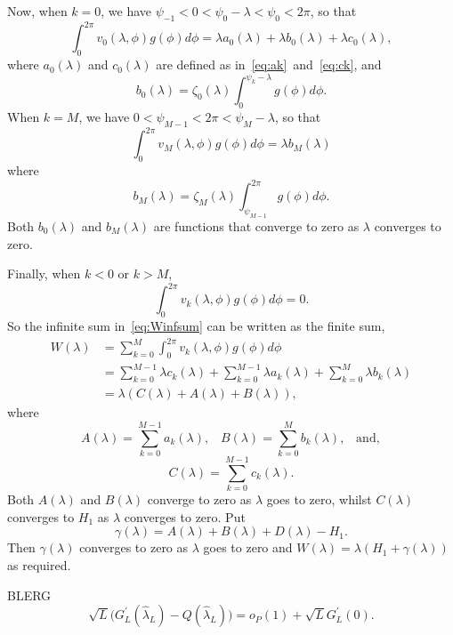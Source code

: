 \documentclass[journal]{IEEEtran}
\begin{document}
\begin{IEEEproof}
Now, when $k = 0$, we have $\psi_{-1} < 0 < \psi_0 - \lambda < \psi_0 < 2\pi$, so that
\[
\int_0^{2\pi} v_0(\lambda, \phi) g(\phi) d\phi = \lambda a_0(\lambda) + \lambda b_0(\lambda) +  \lambda c_0(\lambda),
\]
where $a_0(\lambda)$ and $c_0(\lambda)$ are defined as in~\eqref{eq:ak}~and~\eqref{eq:ck}, and
\[
b_0(\lambda) = \zeta_0(\lambda) \int_{0}^{\psi_k-\lambda} g(\phi) d\phi.
\]
When $k = M$, we have $0 < \psi_{M-1} < 2\pi < \psi_{M} - \lambda$, so that
\[
\int_0^{2\pi} v_{M}(\lambda, \phi) g(\phi) d\phi = \lambda b_{M}(\lambda)
\]
where 
\[
b_{M}(\lambda) = \zeta_{M}(\lambda) \int_{\psi_{M-1}}^{2\pi}g(\phi) d\phi.
\]
Both $b_0(\lambda)$ and $b_M(\lambda)$ are functions that converge to zero as $\lambda$ converges to zero.
 
Finally, when $k < 0$ or $k > M$, 
\[
\int_0^{2\pi} v_k(\lambda, \phi) g(\phi) d\phi = 0.
\]
So the infinite sum in~\eqref{eq:Winfsum} can be written as the finite sum,
\begin{align*}
W(\lambda) &= \sum_{k=0}^{M} \int_{0}^{2\pi} v_k(\lambda, \phi) g(\phi) d\phi \\
&= \sum_{k=0}^{M-1} \lambda c_k(\lambda) + \sum_{k=0}^{M-1} \lambda a_k(\lambda) + \sum_{k=0}^{M} \lambda b_k(\lambda) \\
&= \lambda \left( C(\lambda)  + A(\lambda) + B(\lambda) \right),
\end{align*}
where 
\[
A(\lambda) = \sum_{k=0}^{M-1} a_k(\lambda), \;\;\; B(\lambda) = \sum_{k=0}^{M} b_k(\lambda), \;\;\; \text{and},
\]
\[
C(\lambda) = \sum_{k=0}^{M-1} c_k(\lambda).
\]
Both $A(\lambda)$ and $B(\lambda)$ converge to zero as $\lambda$ goes to zero, whilst $C(\lambda)$ converges to $H_1$ as $\lambda$ converges to zero.  Put
\[
\gamma(\lambda) = A(\lambda) + B(\lambda) + D(\lambda) - H_1.
\]
Then $\gamma(\lambda)$ converges to zero as $\lambda$ goes to zero and $W(\lambda) = \lambda(H_1 + \gamma(\lambda))$ as required.
\end{IEEEproof}

\begin{lemma}\label{lem:empiricprocc} BLERG
\[
\sqrt{L}\big( G_L^\prime(\hat{\lambda}_L) - Q(\hat{\lambda}_L) \big) = o_P(1) + \sqrt{L} G_L^\prime(0).
\]
\end{lemma}
\begin{IEEEproof}

\end{IEEEproof}
\end{document}
